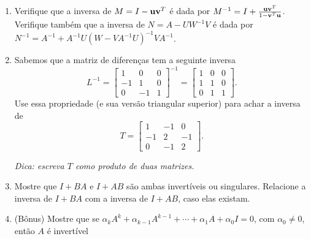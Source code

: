 \documentclass[leqno]{article}
\numberwithin{equation}{section}
\begin{document}
\begin{enumerate}
\item Verifique que a inversa de $M = I - \mathbf{u} \mathbf{v}^T$ é dada por $M^{-1} = I + \frac{\mathbf{u}\mathbf{v}^T}{1 - \mathbf{v}^T\mathbf{u}}$. Verifique também que a inversa de $N = A - UW^{-1}V$ é dada por $N^{-1} = A^{-1} + A^{-1}U(W - VA^{-1}U)^{-1}VA^{-1}$.

\begin{sol} 
\end{sol} 

\item Sabemos que a matriz de diferenças tem a seguinte inversa
$$L^{-1} = \begin{bmatrix}
1 & 0 & 0\\
-1 & 1 & 0\\
0 & -1 & 1
\end{bmatrix}^{-1} = \begin{bmatrix}
1 & 0 & 0\\
1 & 1 & 0\\
0 & 1 & 1
\end{bmatrix}.$$
Use essa propriedade (e sua versão triangular superior) para achar a inversa de
$$T = \begin{bmatrix}
1 & -1 & 0\\
-1 & 2 & -1\\
0 & -1 & 2
\end{bmatrix}.$$

\textit{Dica: escreva $T$ como produto de duas matrizes.}

\begin{sol} 
\end{sol} 

\item Mostre que $I + BA$ e $I + AB$ são ambas invertíveis ou singulares. Relacione a inversa de $I + BA$ com a inversa de $I + AB$, caso elas existam.

\begin{sol} 
\end{sol}

\item (Bônus) Mostre que se $\alpha_kA^k + \alpha_{k-1}A^{k-1} + \cdots + \alpha_1 A + \alpha_0 I = 0$, com $\alpha_0 \neq 0$, então $A$ é invertível

\begin{sol} 
\end{sol} 
\end{enumerate}
\end{document}
